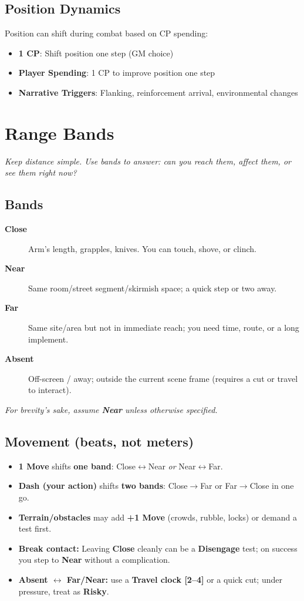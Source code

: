 \documentclass[11pt]{article}
\begin{document}
\subsection{Position Dynamics}
Position can shift during combat based on CP spending:
\begin{itemize}
    \item \textbf{1 CP}: Shift position one step (GM choice)
    \item \textbf{Player Spending}: 1 CP to improve position one step
    \item \textbf{Narrative Triggers}: Flanking, reinforcement arrival, environmental changes
\end{itemize}

\section{Range Bands} 

\textit{Keep distance simple. Use bands to answer: can you reach them, affect them, or see them right now?}

\subsection*{Bands}
\begin{description}
  \item[\textbf{Close}] Arm's length, grapples, knives. You can touch, shove, or clinch.
  \item[\textbf{Near}] Same room/street segment/skirmish space; a quick step or two away.
  \item[\textbf{Far}] Same site/area but not in immediate reach; you need time, route, or a long implement.
  \item[\textbf{Absent}] Off-screen / away; outside the current scene frame (requires a cut or travel to interact).
\end{description}
\emph{For brevity's sake, assume \textbf{Near} unless otherwise specified.}

\subsection*{Movement (beats, not meters)}
\begin{itemize}
  \item \textbf{1 Move} shifts \textbf{one band}: Close$\leftrightarrow$Near \emph{or} Near$\leftrightarrow$Far.
  \item \textbf{Dash (your action)} shifts \textbf{two bands}: Close$\rightarrow$Far or Far$\rightarrow$Close in one go.
  \item \textbf{Terrain/obstacles} may add \textbf{+1 Move} (crowds, rubble, locks) or demand a test first.
  \item \textbf{Break contact:} Leaving \textbf{Close} cleanly can be a \textbf{Disengage} test; on success you step to \textbf{Near} without a complication.
  \item \textbf{Absent $\leftrightarrow$ Far/Near:} use a \textbf{Travel clock [2–4]} or a quick cut; under pressure, treat as \textbf{Risky}.
\end{itemize}
\end{document}
